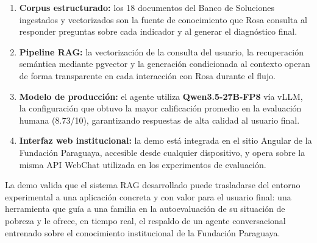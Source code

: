 \begin{enumerate}
  \item \textbf{Corpus estructurado:} los 18 documentos del Banco de Soluciones ingestados y vectorizados son la fuente de conocimiento que Rosa consulta al responder preguntas sobre cada indicador y al generar el diagnóstico final.
  \item \textbf{Pipeline RAG:} la vectorización de la consulta del usuario, la recuperación semántica mediante pgvector y la generación condicionada al contexto operan de forma transparente en cada interacción con Rosa durante el flujo.
  \item \textbf{Modelo de producción:} el agente utiliza \textbf{Qwen3.5-27B-FP8} vía vLLM, la configuración que obtuvo la mayor calificación promedio en la evaluación humana (8.73/10), garantizando respuestas de alta calidad al usuario final.
  \item \textbf{Interfaz web institucional:} la demo está integrada en el sitio Angular de la Fundación Paraguaya, accesible desde cualquier dispositivo, y opera sobre la misma API WebChat utilizada en los experimentos de evaluación.
\end{enumerate}

La demo valida que el sistema RAG desarrollado puede trasladarse del entorno experimental a una aplicación concreta y con valor para el usuario final: una herramienta que guía a una familia en la autoevaluación de su situación de pobreza y le ofrece, en tiempo real, el respaldo de un agente conversacional entrenado sobre el conocimiento institucional de la Fundación Paraguaya.

